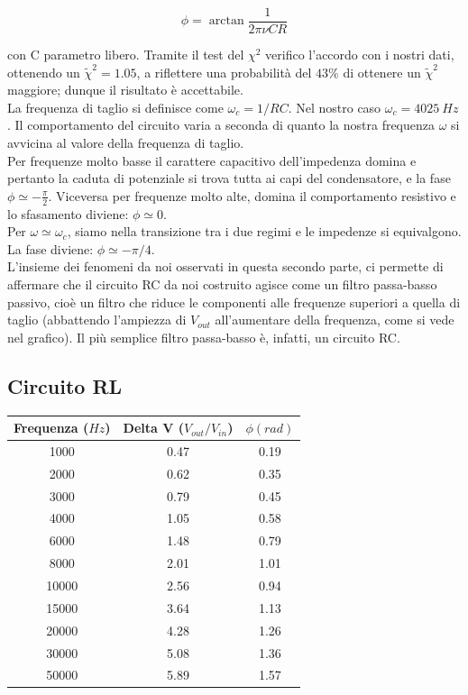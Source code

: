 $$ \phi = \arctan \frac{1}{2\pi\nu C R} $$

con C parametro libero. Tramite il test del $\chi^2$ verifico l'accordo con i nostri dati, ottenendo un $\tilde{\chi}^2 = 1.05$, a riflettere una probabilità del $43\%$ di ottenere un $\tilde{\chi}^2$ maggiore; dunque il risultato è accettabile.
\\


La frequenza di taglio si definisce come $\omega_c = 1/RC$. Nel nostro caso $\omega_c = 4025\ Hz$. Il comportamento del circuito varia a seconda di quanto la nostra frequenza $\omega$ si avvicina al valore della frequenza di taglio. \\
Per frequenze molto basse il carattere capacitivo dell'impedenza domina e pertanto la caduta di potenziale si trova tutta ai capi del condensatore, e la fase $\phi \simeq -\frac{\pi}{2}$. Viceversa per frequenze molto alte, domina il comportamento resistivo e lo sfasamento diviene: $ \phi \simeq 0$. \\  
Per $\omega \simeq \omega_c$, siamo nella transizione tra i due regimi e le impedenze si equivalgono. La fase diviene: $ \phi \simeq -\pi/4$.  \\

L'insieme dei fenomeni da noi osservati in questa secondo parte, ci permette di affermare che il circuito RC da noi costruito agisce come un filtro passa-basso passivo, cioè un filtro che riduce le componenti alle frequenze superiori a quella di taglio (abbattendo l'ampiezza di $V_{out}$ all'aumentare della frequenza, come si vede nel grafico). Il più semplice filtro passa-basso è, infatti, un circuito RC. 

\subsection{Circuito RL}
\begin{center}

\begin{tabular}{*{3}{c}}
Frequenza ($Hz$) & Delta V ($V_{out}/V_{in}$) & $\phi (rad)$ \\
\midrule
1000& 0.47 & 0.19 \\
2000 & 0.62 & 0.35\\
3000 & 0.79 & 0.45\\
4000 & 1.05 & 0.58\\
6000 & 1.48 & 0.79\\
8000 & 2.01 & 1.01\\
10000 & 2.56 & 0.94\\
15000 & 3.64 & 1.13\\
20000 & 4.28 & 1.26\\
30000 & 5.08 & 1.36\\
50000 & 5.89 & 1.57\\
\end{tabular}
\end{center}


